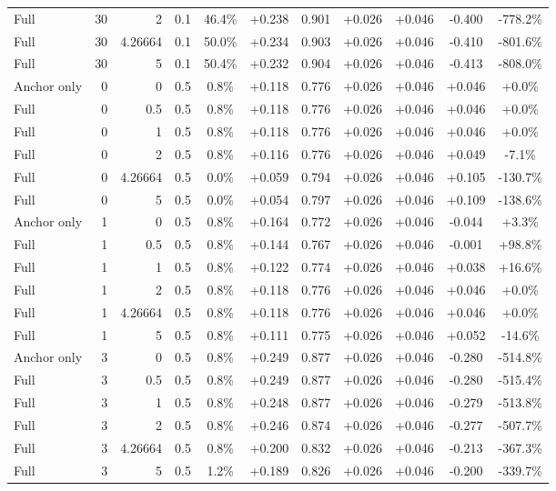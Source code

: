 \begin{table}[htbp]
\begin{tabular}{lrrrccccccc}
Full & 30 & 2 & 0.1 & 46.4\% & +0.238 & 0.901 & +0.026 & +0.046 & -0.400 & -778.2\% \\
Full & 30 & 4.26664 & 0.1 & 50.0\% & +0.234 & 0.903 & +0.026 & +0.046 & -0.410 & -801.6\% \\
Full & 30 & 5 & 0.1 & 50.4\% & +0.232 & 0.904 & +0.026 & +0.046 & -0.413 & -808.0\% \\
Anchor only & 0 & 0 & 0.5 & 0.8\% & +0.118 & 0.776 & +0.026 & +0.046 & +0.046 & +0.0\% \\
Full & 0 & 0.5 & 0.5 & 0.8\% & +0.118 & 0.776 & +0.026 & +0.046 & +0.046 & +0.0\% \\
Full & 0 & 1 & 0.5 & 0.8\% & +0.118 & 0.776 & +0.026 & +0.046 & +0.046 & +0.0\% \\
Full & 0 & 2 & 0.5 & 0.8\% & +0.116 & 0.776 & +0.026 & +0.046 & +0.049 & -7.1\% \\
Full & 0 & 4.26664 & 0.5 & 0.0\% & +0.059 & 0.794 & +0.026 & +0.046 & +0.105 & -130.7\% \\
Full & 0 & 5 & 0.5 & 0.0\% & +0.054 & 0.797 & +0.026 & +0.046 & +0.109 & -138.6\% \\
Anchor only & 1 & 0 & 0.5 & 0.8\% & +0.164 & 0.772 & +0.026 & +0.046 & -0.044 & +3.3\% \\
Full & 1 & 0.5 & 0.5 & 0.8\% & +0.144 & 0.767 & +0.026 & +0.046 & -0.001 & +98.8\% \\
Full & 1 & 1 & 0.5 & 0.8\% & +0.122 & 0.774 & +0.026 & +0.046 & +0.038 & +16.6\% \\
Full & 1 & 2 & 0.5 & 0.8\% & +0.118 & 0.776 & +0.026 & +0.046 & +0.046 & +0.0\% \\
Full & 1 & 4.26664 & 0.5 & 0.8\% & +0.118 & 0.776 & +0.026 & +0.046 & +0.046 & +0.0\% \\
Full & 1 & 5 & 0.5 & 0.8\% & +0.111 & 0.775 & +0.026 & +0.046 & +0.052 & -14.6\% \\
Anchor only & 3 & 0 & 0.5 & 0.8\% & +0.249 & 0.877 & +0.026 & +0.046 & -0.280 & -514.8\% \\
Full & 3 & 0.5 & 0.5 & 0.8\% & +0.249 & 0.877 & +0.026 & +0.046 & -0.280 & -515.4\% \\
Full & 3 & 1 & 0.5 & 0.8\% & +0.248 & 0.877 & +0.026 & +0.046 & -0.279 & -513.8\% \\
Full & 3 & 2 & 0.5 & 0.8\% & +0.246 & 0.874 & +0.026 & +0.046 & -0.277 & -507.7\% \\
Full & 3 & 4.26664 & 0.5 & 0.8\% & +0.200 & 0.832 & +0.026 & +0.046 & -0.213 & -367.3\% \\
Full & 3 & 5 & 0.5 & 1.2\% & +0.189 & 0.826 & +0.026 & +0.046 & -0.200 & -339.7\% \\

\end{tabular}
\end{table}
